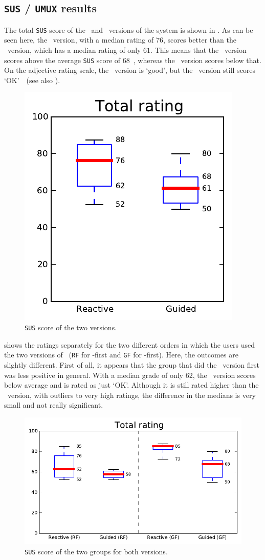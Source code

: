 \subsection{\texttt{SUS} / \texttt{UMUX} results}
The total \verb|SUS| score of the \IDa\ and \IDb\ versions of the system is shown in . As can be seen here, the \IDa\ version, with a median rating of $76$, scores better than the \IDb\ version, which has a median rating of only $61$. This means that the \IDa\ version scores above the average \verb|SUS| score of 68~\cite{sauro2011measuring}, whereas the \IDb\ version scores below that. On the adjective rating scale, the \IDa\ version is `good', but the \IDb\ version still scores `OK'~\cite{bangor2009determining}~(see also ).

\begin{figure}[h!]
\center
\includegraphics[width=.32\textwidth]{img/graphs/4a_10.pdf}
\caption{\texttt{SUS} score of the two versions.}
\end{figure}

 shows the ratings separately for the two different orders in which the users used the two versions of \oframp~(\verb|RF| for \IDa-first and \verb|GF| for \IDb-first). Here, the outcomes are slightly different. First of all, it appears that the group that did the \IDa\ version first was less positive in general. With a median grade of only 62, the \IDa\ version scores below average and is rated as just `OK'. Although it is still rated higher than the \IDb\ version, with outliers to very high ratings, the difference in the medians is very small and not really significant.

\begin{figure}[h!]
\center
\includegraphics[width=.6\textwidth]{img/graphs/4b_10.pdf}
\caption{\texttt{SUS} score of the two groups for both versions.}
\end{figure}

